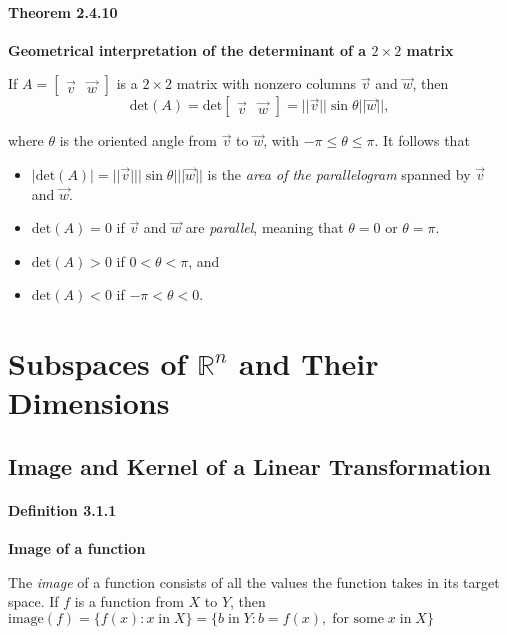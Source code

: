 \documentclass{report}
\begin{document}
\subsubsection*{Theorem 2.4.10}
\par\noindent\textbf{Geometrical interpretation of the determinant of a $2\times{}2$ matrix}
\par\noindent If $A=\left[\begin{array}{cc}\vec{v}&\vec{w}\end{array}\right]$ is a $2\times{}2$ matrix with nonzero columns $\vec{v}$ and $\vec{w}$, then
\[\textrm{det}(A)=\textrm{det}\left[\begin{array}{cc}\vec{v}&\vec{w}\end{array}\right]=||\vec{v}||\sin\theta{}||\vec{w}||,\]
\par\noindent where $\theta$ is the oriented angle from $\vec{v}$ to $\vec{w}$, with $-\pi\le\theta\le\pi$. It follows that
\begin{itemize}
\item $|\textrm{det}(A)|=||\vec{v}|||\sin\theta{}|||\vec{w}||$ is the \textit{area of the parallelogram} spanned by $\vec{v}$ and $\vec{w}$.
\item $\textrm{det}(A)=0$ if $\vec{v}$ and $\vec{w}$ are \textit{parallel}, meaning that $\theta=0$ or $\theta=\pi$.
\item $\textrm{det}(A)>0$ if $0<\theta<\pi$, and
\item $\textrm{det}(A)<0$ if $-\pi<\theta<0$.
\end{itemize}
\pagebreak

\chapter{Subspaces of \texorpdfstring{$\mathbb{R}^{n}$}{R^n} and Their Dimensions}

\section{Image and Kernel of a Linear Transformation}
\subsubsection*{Definition 3.1.1}
\par\noindent\textbf{Image of a function}
\par\noindent The \textit{image} of a function consists of all the values the function takes in its target space. If $f$ is a function from $X$ to $Y$, then $\textrm{image}(f)=\{f(x):x\;{}\textrm{in}\;{}X\}=\{b\;\textrm{in}\;{}Y:b=f(x),\;{}\textrm{for some}\;{}x\;{}\textrm{in}\;{}X\}$
\end{document}
